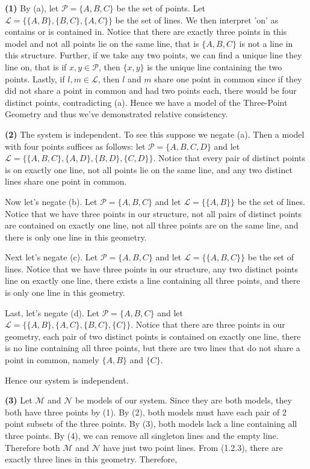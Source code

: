 \documentclass[12pt]{book}
\def\cL{{\mathcal{L}}}
\def\cM{{\mathcal{M}}}
\def\cN{{\mathcal{N}}}
\def\cP{{\mathcal{P}}}
\begin{document}
\textbf{(1)} By (a), let $\cP=\{A,B,C\}$ be the set of points. Let $\cL=\{\{A,B\},\{B,C\},\{A,C\}\}$ be the set of lines. We then interpret 'on' as contains or is contained in. Notice that there are exactly three points in this model and not all points lie on the same line, that is $\{A,B,C\}$ is not a line in this structure. Further, if we take any two points, we can find a unique line they line on, that is if $x,y\in\cP$, then $\{x,y\}$ is the unique line containing the two points. Lastly, if $l,m\in\cL$, then $l$ and $m$ share one point in common since if they did not share a point in common and had two points each, there would be four distinct points, contradicting (a). Hence we have a model of the Three-Point Geometry and thus we've demonstrated relative consistency.

\textbf{(2)} The system is independent. To see this suppose we negate (a). Then a model with four points suffices as follows: let $\cP=\{A,B,C,D\}$ and let $\cL=\{\{A,B,C\},\{A,D\},\{B,D\},\{C,D\}\}$. Notice that every pair of distinct points is on exactly one line, not all points lie on the same line, and any two distinct lines share one point in common.

Now let's negate (b). Let $\cP=\{A,B,C\}$ and let $\cL=\{\{A,B\}\}$ be the set of lines. Notice that we have three points in our structure, not all pairs of distinct points are contained on exactly one line, not all three points are on the same line, and there is only one line in this geometry.

Next let's negate (c). Let $\cP=\{A,B,C\}$ and let $\cL=\{\{A,B,C\}\}$ be the set of lines. Notice that we have three points in our structure, any two distinct points line on exactly one line, there exists a line containing all three points, and there is only one line in this geometry.

Last, let's negate (d). Let $\cP=\{A,B,C\}$ and let $\cL=\{\{A,B\},\{A,C\},\{B,C\},\{C\}\}$. Notice that there are three points in our geometry, each pair of two distinct points is contained on exactly one line, there is no line containing all three points, but there are two lines that do not share a point in common, namely $\{A,B\}$ and $\{C\}$.

Hence our system is independent.

\textbf{(3)} Let $\cM$ and $\cN$ be models of our system. Since they are both models, they both have three points by (1). By (2), both models must have each pair of 2 point subsets of the three points. By (3), both models lack a line containing all three points. By (4), we can remove all singleton lines and the empty line. Therefore both $\cM$ and $\cN$ have just two point lines. From (1.2.3), there are exactly three lines in this geometry. Therefore, 
\end{document}
